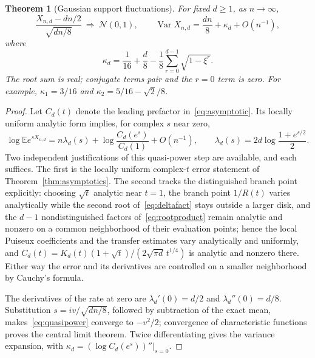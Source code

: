 \documentclass[11pt]{article}
\numberwithin{equation}{section}
\newtheorem{theorem}{Theorem}[section]
\theoremstyle{definition}
\newcommand{\Var}{\operatorname{Var}}
\newcommand{\E}{\mathbb E}
\begin{document}
\begin{theorem}[Gaussian support fluctuations]
\label{thm:CLT}
For fixed $d\geq1$, as $n\to\infty$,
\begin{equation}
 \frac{X_{n,d}-dn/2}{\sqrt{dn/8}}\ \Longrightarrow\ \mathcal N(0,1),
 \qquad
 \Var X_{n,d}=\frac{dn}{8}+\kappa_d+O(n^{-1}),
 \label{eq:CLT}
\end{equation}
where
\begin{equation}
 \boxed{\kappa_d=\frac1{16}+\frac d8
                -\frac18\sum_{r=0}^{d-1}\sqrt{1-\xi^r}.}
 \label{eq:kappa}
\end{equation}
The root sum is real; conjugate terms pair and the $r=0$ term is zero.
For example, $\kappa_1=3/16$ and
$\kappa_2=5/16-\sqrt2/8$.
\end{theorem}
\begin{proof}
Let $C_d(t)$ denote the leading prefactor in~\eqref{eq:asymptotic}.
Its locally uniform analytic form implies, for complex $s$ near zero,
\begin{equation}
 \log\E e^{sX_{n,d}}
 =n\lambda_d(s)+\log\frac{C_d(e^s)}{C_d(1)}+O(n^{-1}),
 \qquad
 \lambda_d(s)=2d\log\frac{1+e^{s/2}}2.
 \label{eq:quasipower}
\end{equation}
Two independent justifications of this quasi-power step are available, and
each suffices. The first is the locally uniform complex-$t$ error statement of
Theorem~\ref{thm:asymptotics}. The second tracks the distinguished branch
point explicitly: choosing $\sqrt t$ analytic near $t=1$, the branch point
$1/R(t)$ varies analytically while the second root of~\eqref{eq:deltafact}
stays outside a larger disk, and the $d-1$ nondistinguished factors
of~\eqref{eq:rootproduct} remain analytic and nonzero on a common
neighborhood of their evaluation points; hence the local Puiseux coefficients
and the transfer estimates vary analytically and uniformly, and
$C_d(t)=K_d(t)(1+\sqrt t)/(2\sqrt{\pi d}\,t^{1/4})$ is analytic and nonzero
there. Either way the error and its derivatives are controlled on a smaller
neighborhood by Cauchy's formula.

The derivatives of the rate at zero are $\lambda_d'(0)=d/2$ and
$\lambda_d''(0)=d/8$. Substitution $s=iv/\sqrt{dn/8}$, followed by subtraction
of the exact mean, makes~\eqref{eq:quasipower} converge to $-v^2/2$;
convergence of characteristic functions proves the central limit theorem.
Twice differentiating gives the variance expansion, with
$\kappa_d=(\log C_d(e^s))''|_{s=0}$.


\end{proof}
\end{document}
